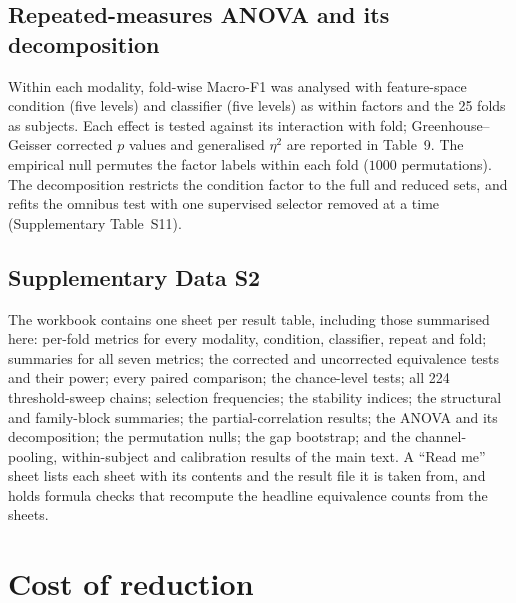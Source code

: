 \documentclass[10pt,a4paper]{article}
\begin{document}
\subsection{Repeated-measures ANOVA and its decomposition}

Within each modality, fold-wise Macro-F1 was analysed with feature-space
condition (five levels) and classifier (five levels) as within factors and the
25 folds as subjects. Each effect is tested against its interaction with fold;
Greenhouse--Geisser corrected $p$ values and generalised $\eta^2$ are reported
in Table~9. The empirical null permutes the factor labels within each fold
($1000$ permutations). The decomposition restricts the condition factor to the
full and reduced sets, and refits the omnibus test with one supervised selector
removed at a time (Supplementary Table~S11).

\subsection{Supplementary Data S2}

The workbook contains one sheet per result table, including those summarised
here: per-fold metrics for every modality, condition, classifier, repeat and
fold; summaries for all seven metrics; the corrected and uncorrected
equivalence tests and their power; every paired comparison; the chance-level
tests; all 224 threshold-sweep chains; selection frequencies; the stability
indices; the structural and family-block summaries; the partial-correlation
results; the ANOVA and its decomposition; the permutation nulls; the gap
bootstrap; and the channel-pooling, within-subject and calibration results of
the main text. A ``Read me'' sheet lists each sheet with its contents and the
result file it is taken from, and holds formula checks that recompute the
headline equivalence counts from the sheets.

\section{Cost of reduction}

\FloatBarrier


\end{document}
